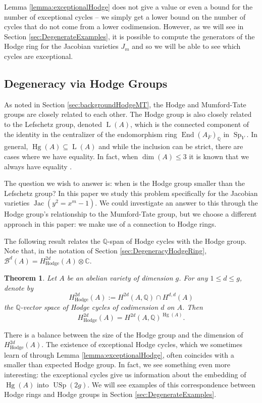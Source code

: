\documentclass[reqno, oneside, 12pt]{amsart}
\DeclareMathOperator{\Jac}{Jac}
\DeclareMathOperator{\USp}{USp}
\DeclareMathOperator{\Sp}{Sp}
\DeclareMathOperator{\End}{End}
\DeclareMathOperator{\Hg}{Hg}
\DeclareMathOperator{\LL}{L}
\newcommand{\Q}{\mathbb{Q}}
\newcommand{\C}{\mathbb{C}}
\newtheorem{theorem}{Theorem}[section]
\theoremstyle{remark}
\numberwithin{equation}{section}
\begin{document}
Lemma \ref{lemma:exceptionalHodge} does not give a value or even a bound for the number of exceptional cycles -- we simply get a lower bound on the number of cycles that do not come from a lower codimension. However, as we will see in Section \ref{sec:DegenerateExamples}, it is possible to compute the generators of the Hodge ring for the Jacobian varieties $J_m$ and so we will be able to see which cycles are exceptional.


\subsection{Degeneracy via Hodge Groups}\label{sec:DegeneracyHodgeGroup}



As noted in Section \ref{sec:backgroundHodgeMT}, the Hodge and Mumford-Tate groups are closely related to each other. The Hodge group is also closely related to the Lefschetz group, denoted $\LL(A)$, which is the connected component of the identity in the centralizer of the endomorphism ring $\End(A_{\overline F})_\Q$ in $\Sp_{V}$. In general, $\Hg(A)\subseteq \LL(A)$ and while the inclusion can be strict, there are cases where we have equality. In fact, when $\dim(A)\leq 3$ it is known that we always have equality \cite{Banaszak2015}. 

The question we wish to answer is: when is the Hodge group smaller than the Lefschetz group? In this paper we study this problem specifically for the Jacobian varieties $\Jac(y^2=x^m-1)$. We could investigate an answer to this through the Hodge group's relationship to the Mumford-Tate group, but we choose a different approach in this paper: we make use of a connection to Hodge rings.

The following result relates the $\Q$-span of Hodge cycles with the Hodge group. Note that, in the notation of Section \ref{sec:DegeneracyHodgeRing}, $\mathscr B^d(A)=H^{2d}_\text{Hodge}(A)\otimes\C$. 

\begin{theorem}\cite[Theorem 17.3.3]{BirkenhakeLange2004}\label{thm:Hodge}
Let $A$ be an abelian variety of dimension $g$. For any $1\leq d \leq g$, denote by 
$$H^{2d}_\text{Hodge}(A):=H^{2d}(A,\Q)\cap H^{d,d}(A)$$
the $\Q$-vector space of Hodge cycles of codimension $d$ on $A$. Then
$$H^{2d}_\text{Hodge}(A)= H^{2d}(A,\Q)^{\Hg(A)}.$$
\end{theorem}

There is a balance between the size of the Hodge group and the dimension of $H^{2d}_\text{Hodge}(A)$. The existence of exceptional Hodge cycles, which we sometimes learn of through Lemma \ref{lemma:exceptionalHodge}, often coincides with a smaller than expected Hodge group. In fact, we see something even more interesting: the exceptional cycles give us information about the embedding of $\Hg(A)$ into $\USp(2g)$. We will see examples of this correspondence between Hodge rings and Hodge groups in Section \ref{sec:DegenerateExamples}.
\end{document}
